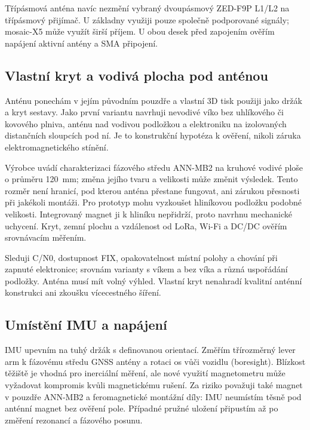 Třípásmová anténa navíc nezmění vybraný dvoupásmový ZED-F9P L1/L2 na
třípásmový přijímač. U základny využiji pouze společně podporované
signály; mosaic-X5 může využít širší příjem.\cite{ublox-f9p,septentrio-mosaic}
U obou desek před zapojením ověřím napájení aktivní antény a SMA připojení.

\subsection{Vlastní kryt a vodivá plocha pod anténou}

Anténu ponechám v jejím původním pouzdře a vlastní 3D tisk použiji jako
držák a kryt sestavy. Jako první variantu navrhuji nevodivé víko bez
uhlíkového či kovového plniva, anténu nad vodivou podložkou a elektroniku
na izolovaných distančních sloupcích pod ní. Je to konstrukční hypotéza
k ověření, nikoli záruka elektromagnetického stínění.

Výrobce uvádí charakterizaci fázového středu ANN-MB2 na kruhové vodivé
ploše o průměru \SI{120}{mm}; změna jejího tvaru a velikosti může změnit
výsledek.\cite{ublox-annmb2-ds}
Tento rozměr není hranicí, pod kterou anténa přestane fungovat, ani
zárukou přesnosti při jakékoli montáži. Pro prototyp mohu vyzkoušet
hliníkovou podložku podobné velikosti. Integrovaný magnet ji k hliníku
nepřidrží, proto navrhnu mechanické uchycení. Kryt, zemní plochu a
vzdálenost od LoRa, Wi-Fi a DC/DC ověřím srovnávacím měřením.

Sleduji C/N0, dostupnost FIX, opakovatelnost místní polohy a chování
při zapnuté elektronice; srovnám varianty s víkem a bez víka a různá
uspořádání podložky. Anténa musí mít volný výhled. Vlastní kryt nenahradí
kvalitní anténní konstrukci ani zkoušku vícecestného šíření.

\subsection{Umístění IMU a napájení}

IMU upevním na tuhý držák s definovanou orientací. Změřím třírozměrný
lever arm k fázovému středu GNSS antény a rotaci os vůči vozidlu
(boresight). Blízkost těžiště je vhodná pro inerciální měření, ale nové
využití magnetometru může vyžadovat kompromis kvůli magnetickému rušení.
Za riziko považuji také magnet v pouzdře ANN-MB2 a feromagnetické
montážní díly: IMU neumístím těsně pod anténní magnet bez ověření pole.
Případné pružné uložení připustím až po změření rezonancí a fázového posunu.

